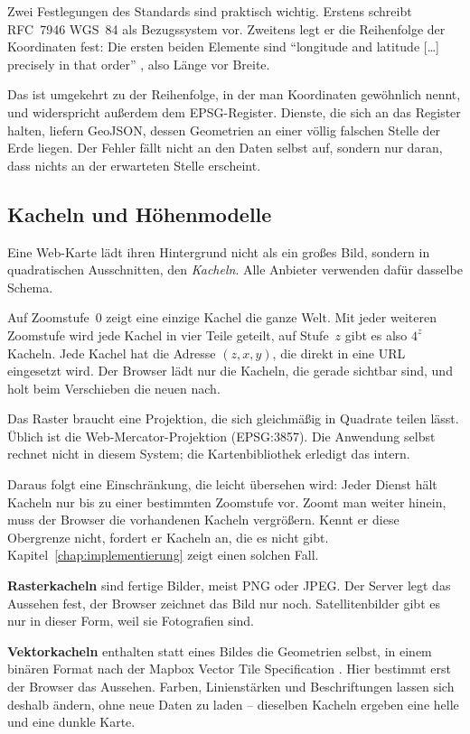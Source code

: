 \documentclass[12pt,a4paper]{report}
\begin{document}
Zwei Festlegungen des Standards sind praktisch wichtig. Erstens schreibt RFC~7946 WGS~84
als Bezugssystem vor. Zweitens legt er die Reihenfolge der Koordinaten fest: Die ersten
beiden Elemente sind \enquote{longitude and latitude [\ldots] precisely in that order}
\cite{RFC7946}, also Länge vor Breite.

Das ist umgekehrt zu der Reihenfolge, in der man Koordinaten gewöhnlich nennt, und
widerspricht außerdem dem EPSG-Register. Dienste, die sich an das Register halten, liefern
GeoJSON, dessen Geometrien an einer völlig falschen Stelle der Erde liegen. Der Fehler
fällt nicht an den Daten selbst auf, sondern nur daran, dass nichts an der erwarteten
Stelle erscheint.

\subsection{Kacheln und Höhenmodelle}
\label{subsec:kacheln}

Eine Web-Karte lädt ihren Hintergrund nicht als ein großes Bild, sondern in quadratischen
Ausschnitten, den \emph{Kacheln}. Alle Anbieter verwenden dafür dasselbe Schema.

Auf Zoomstufe~0 zeigt eine einzige Kachel die ganze Welt. Mit jeder weiteren Zoomstufe
wird jede Kachel in vier Teile geteilt, auf Stufe~$z$ gibt es also $4^{z}$ Kacheln. Jede
Kachel hat die Adresse $(z, x, y)$, die direkt in eine URL eingesetzt wird. Der Browser
lädt nur die Kacheln, die gerade sichtbar sind, und holt beim Verschieben die neuen nach.

Das Raster braucht eine Projektion, die sich gleichmäßig in Quadrate teilen lässt. Üblich
ist die Web-Mercator-Projektion (EPSG:3857). Die Anwendung selbst rechnet nicht in diesem
System; die Kartenbibliothek erledigt das intern.

Daraus folgt eine Einschränkung, die leicht übersehen wird: Jeder Dienst hält Kacheln nur
bis zu einer bestimmten Zoomstufe vor. Zoomt man weiter hinein, muss der Browser die
vorhandenen Kacheln vergrößern. Kennt er diese Obergrenze nicht, fordert er Kacheln an, die
es nicht gibt. Kapitel~\ref{chap:implementierung} zeigt einen solchen Fall.

\textbf{Rasterkacheln} sind fertige Bilder, meist PNG oder JPEG. Der Server legt das
Aussehen fest, der Browser zeichnet das Bild nur noch. Satellitenbilder gibt es nur in
dieser Form, weil sie Fotografien sind.

\textbf{Vektorkacheln} enthalten statt eines Bildes die Geometrien selbst, in einem binären
Format nach der Mapbox Vector Tile Specification \cite{MVTSpec}. Hier bestimmt erst der
Browser das Aussehen. Farben, Linienstärken und Beschriftungen lassen sich deshalb ändern,
ohne neue Daten zu laden -- dieselben Kacheln ergeben eine helle und eine dunkle Karte.
\end{document}
